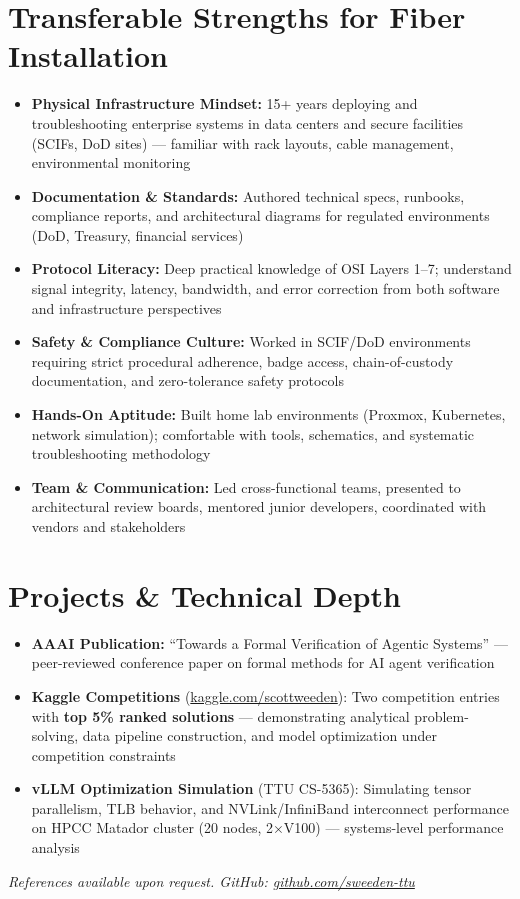 \documentclass[10pt,letterpaper]{article}
\begin{document}
\section{Transferable Strengths for Fiber Installation}
\begin{itemize}
    \item \textbf{Physical Infrastructure Mindset:} 15+ years deploying and troubleshooting enterprise systems in data centers and secure facilities (SCIFs, DoD sites) --- familiar with rack layouts, cable management, environmental monitoring
    \item \textbf{Documentation \& Standards:} Authored technical specs, runbooks, compliance reports, and architectural diagrams for regulated environments (DoD, Treasury, financial services)
    \item \textbf{Protocol Literacy:} Deep practical knowledge of OSI Layers 1--7; understand signal integrity, latency, bandwidth, and error correction from both software and infrastructure perspectives
    \item \textbf{Safety \& Compliance Culture:} Worked in SCIF/DoD environments requiring strict procedural adherence, badge access, chain-of-custody documentation, and zero-tolerance safety protocols
    \item \textbf{Hands-On Aptitude:} Built home lab environments (Proxmox, Kubernetes, network simulation); comfortable with tools, schematics, and systematic troubleshooting methodology
    \item \textbf{Team \& Communication:} Led cross-functional teams, presented to architectural review boards, mentored junior developers, coordinated with vendors and stakeholders
\end{itemize}

\section{Projects \& Technical Depth}
\begin{itemize}
    \item \textbf{AAAI Publication:} ``Towards a Formal Verification of Agentic Systems'' --- peer-reviewed conference paper on formal methods for AI agent verification
    \item \textbf{Kaggle Competitions} (\href{https://www.kaggle.com/scottweeden}{kaggle.com/scottweeden}): Two competition entries with \textbf{top 5\% ranked solutions} --- demonstrating analytical problem-solving, data pipeline construction, and model optimization under competition constraints
    \item \textbf{vLLM Optimization Simulation} (TTU CS-5365): Simulating tensor parallelism, TLB behavior, and NVLink/InfiniBand interconnect performance on HPCC Matador cluster (20 nodes, 2$\times$V100) --- systems-level performance analysis
\end{itemize}

\vspace{6pt}
\noindent\textit{References available upon request. GitHub: \href{https://github.com/sweeden-ttu}{github.com/sweeden-ttu}}
\end{document}
